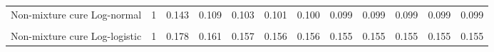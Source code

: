 \documentclass[
]{article}
\begin{document}
\begin{table}[H]
{\begin{tabular}[t]{lrrrrrrrrrrr}
Non-mixture cure Log-normal & 1 & 0.143 & 0.109 & 0.103 & 0.101 & 0.100 & 0.099 & 0.099 & 0.099 & 0.099 & 0.099\\
\cellcolor{gray!10}{Mixture cure Log-logistic} & \cellcolor{gray!10}{1} & \cellcolor{gray!10}{0.163} & \cellcolor{gray!10}{0.143} & \cellcolor{gray!10}{0.139} & \cellcolor{gray!10}{0.138} & \cellcolor{gray!10}{0.137} & \cellcolor{gray!10}{0.137} & \cellcolor{gray!10}{0.137} & \cellcolor{gray!10}{0.137} & \cellcolor{gray!10}{0.137} & \cellcolor{gray!10}{0.136}\\
Non-mixture cure Log-logistic & 1 & 0.178 & 0.161 & 0.157 & 0.156 & 0.156 & 0.155 & 0.155 & 0.155 & 0.155 & 0.155\\
\bottomrule
\end{tabular}}
\end{table}
\end{document}
